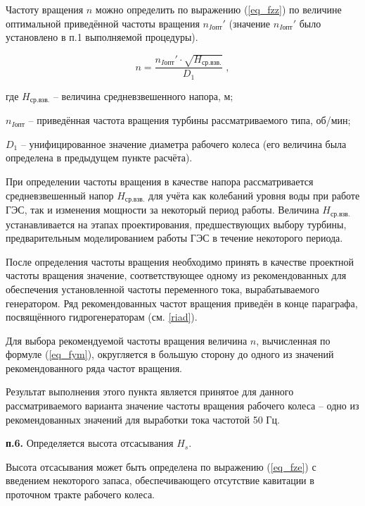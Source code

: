 Частоту вращения $n$ можно определить по выражению (\ref{eq_fzz}) по величине оптимальной приведённой частоты вращения $n_{I\text{опт}}'$ (значение $n_{I\text{опт}}'$ было установлено в п.1 выполняемой процедуры). 

\begin{equation}
\label{eq_fym}
  n = \frac{n_{I\text{опт}}' \cdot \sqrt{H_{\text{ср.взв.}}}}{D_1} \; ,
\end{equation}

где $H_{\text{ср.взв.}}$ -- величина средневзвешенного напора, м;

$n_{I\text{опт}}$ -- приведённая частота вращения турбины рассматриваемого типа, об/мин;

$D_1$ -- унифицированное значение диаметра рабочего колеса (его величина была определена в предыдущем пункте расчёта).

\vspace{0.5cm}

При определении частоты вращения в качестве напора рассматривается средневзвешенный напор $H_{\text{ср.взв.}}$ для учёта как колебаний уровня воды при работе ГЭС, так и изменения мощности за некоторый период работы. Величина $H_{\text{ср.взв.}}$ устанавливается на этапах проектирования, предшествующих выбору турбины,  предварительным моделированием работы ГЭС в течение некоторого периода. 

После определения частоты вращения необходимо принять в качестве проектной частоты вращения значение, соответствующее одному из рекомендованных для обеспечения установленной частоты переменного тока, вырабатываемого генератором. Ряд рекомендованных частот вращения приведён в конце параграфа, посвящённого гидрогенераторам (см. \ref{riad}).

Для выбора рекомендуемой частоты вращения величина $n$, вычисленная по формуле (\ref{eq_fym}), округляется в большую сторону до одного из значений рекомендованного ряда частот вращения.

Результат выполнения этого пункта является принятое для данного рассматриваемого варианта значение частоты вращения рабочего колеса -- одно из рекомендованных значений для выработки тока частотой 50 Гц.




\vspace{1cm}
\textbf{п.6.} Определяется высота отсасывания $H_s$.

Высота отсасывания может быть определена по выражению (\ref{eq_fze}) с введением некоторого запаса, обеспечивающего отсутствие кавитации в проточном тракте рабочего колеса.


